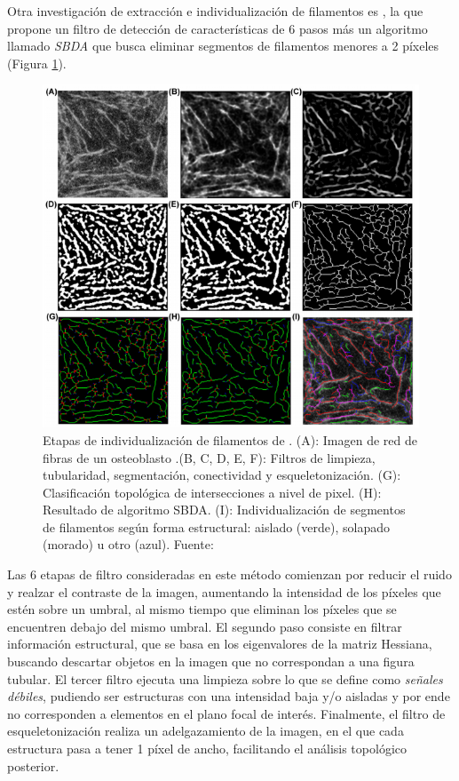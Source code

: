 Otra investigaci\'on de extracci\'on e individualizaci\'on de filamentos es \cite{qiu2014quantitative}, la que propone un filtro de detecci\'on de caracter\'isticas de 6 pasos m\'as un algoritmo llamado \textit{SBDA} que busca eliminar segmentos de filamentos menores a 2 p\'ixeles (Figura \ref{fig:IFS}). 
\begin{figure}[h]
        \centering
        \includegraphics[scale=0.75]{imagenes/QuantitativeIFS.png}
        \caption{Etapas de individualizaci\'on de filamentos de \cite{qiu2014quantitative}. (A): Imagen de red de fibras de un osteoblasto .(B, C, D, E, F): Filtros de limpieza, tubularidad, segmentaci\'on, conectividad y esqueletonizaci\'on. (G): Clasificaci\'on topol\'ogica de intersecciones a nivel de pixel. (H): Resultado de algoritmo SBDA. (I): Individualizaci\'on de segmentos de filamentos seg\'un forma estructural: aislado (verde), solapado (morado) u otro (azul). Fuente: \cite{qiu2014quantitative}}
        \label{fig:IFS}
\end{figure}

Las 6 etapas de filtro consideradas en este m\'etodo comienzan por reducir el ruido y realzar el contraste de la imagen, aumentando la intensidad de los p\'ixeles que est\'en sobre un umbral, al mismo tiempo que eliminan los p\'ixeles que se encuentren debajo del mismo umbral. El segundo paso consiste en filtrar informaci\'on estructural, que se basa en los eigenvalores de la matriz Hessiana, buscando descartar objetos en la imagen que no correspondan a una figura tubular. El tercer filtro ejecuta una limpieza sobre lo que se define como \textit{se\~nales d\'ebiles}, pudiendo ser estructuras con una intensidad baja y/o aisladas y por ende no corresponden a elementos en el plano focal de inter\'es. Finalmente, el filtro de esqueletonizaci\'on realiza un adelgazamiento de la imagen, en el que cada estructura pasa a tener 1 p\'ixel de ancho, facilitando el an\'alisis topol\'ogico posterior. \\

